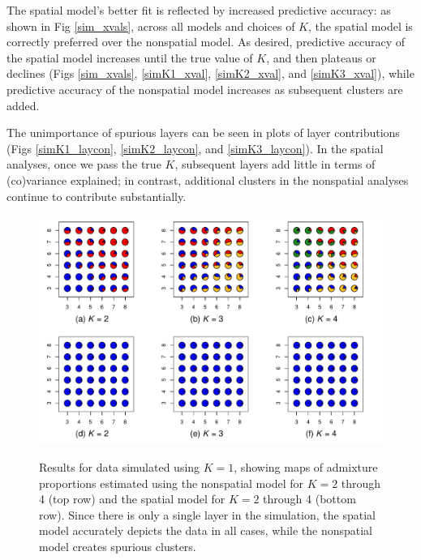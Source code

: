 \documentclass[10pt,letterpaper]{article}
\begin{document}
The spatial model's better fit is reflected by increased predictive accuracy:
as shown in Fig \ref{sim_xvals},
across all models and choices of $K$, the spatial model is correctly preferred over the nonspatial model.
As desired, predictive accuracy of the spatial model increases until the true value of $K$,
and then plateaus or declines
(Figs \ref{sim_xvals}, \ref{simK1_xval}, \ref{simK2_xval}, and \ref{simK3_xval}),
while predictive accuracy of the nonspatial model increases as subsequent clusters are added.


The unimportance of spurious layers can be seen in plots of layer contributions
(Figs \ref{simK1_laycon}, \ref{simK2_laycon}, and \ref{simK3_laycon}).
In the spatial analyses, once we pass the true $K$, 
subsequent layers add little in terms of (co)variance explained; 
in contrast, additional clusters in the nonspatial analyses continue to contribute substantially.

\begin{figure}
	\centering
		{\includegraphics[width=\textwidth]{figs/sims/Fig2_simK1_sp_vs_nsp.pdf}}
	\caption{
        Results for data simulated using $K=1$,
	showing maps of admixture proportions estimated using the nonspatial model for $K=2$ through 4 (top row)
	and the spatial model for $K=2$ through 4 (bottom row).
    Since there is only a single layer in the simulation, the spatial model accurately depicts the data
    in all cases, while the nonspatial model creates spurious clusters.
    }\label{simK1_pies}
\end{figure}
\end{document}
